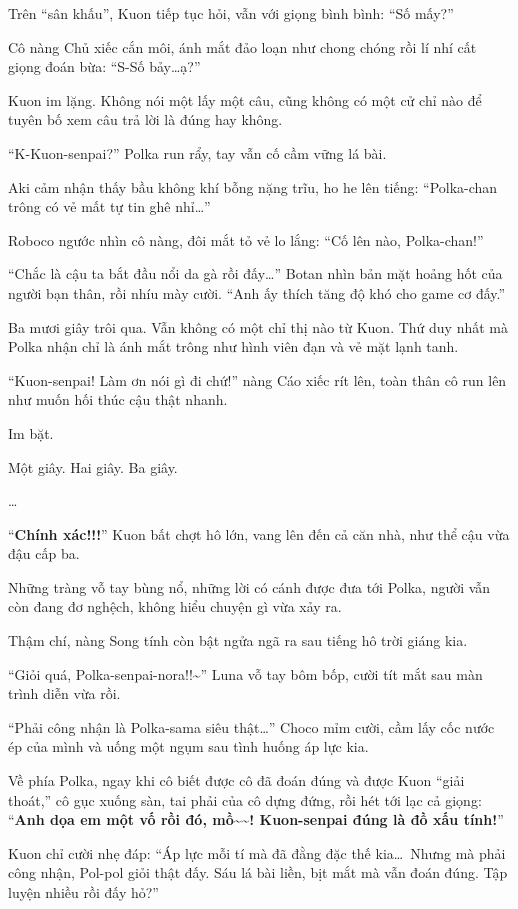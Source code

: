 \documentclass[../main.tex]{subfiles}
\begin{document}
Trên ``sân khấu'', Kuon tiếp tục hỏi, vẫn với giọng bình bình: ``Số mấy?''

Cô nàng Chủ xiếc cắn môi, ánh mắt đảo loạn như chong chóng rồi lí nhí cất giọng đoán bừa: ``S-Số bảy\dots ạ?''

Kuon im lặng. Không nói một lấy một câu, cũng không có một cử chỉ nào để tuyên bố xem câu trả lời là đúng hay không.

``K-Kuon-senpai?'' Polka run rẩy, tay vẫn cố cầm vững lá bài.

Aki cảm nhận thấy bầu không khí bỗng nặng trĩu, ho he lên tiếng: ``Polka-chan trông có vẻ mất tự tin ghê nhỉ\dots''

Roboco ngước nhìn cô nàng, đôi mắt tỏ vẻ lo lắng: ``Cố lên nào, Polka-chan!''

``Chắc là cậu ta bắt đầu nổi da gà rồi đấy\dots'' Botan nhìn bản mặt hoảng hốt của người bạn thân, rồi nhíu mày cười. ``Anh ấy thích tăng độ khó cho game cơ đấy.''

Ba mươi giây trôi qua. Vẫn không có một chỉ thị nào từ Kuon. Thứ duy nhất mà Polka nhận chỉ là ánh mắt trông như hình viên đạn và vẻ mặt lạnh tanh.

``Kuon-senpai! Làm ơn nói gì đi chứ!'' nàng Cáo xiếc rít lên, toàn thân cô run lên như muốn hối thúc cậu thật nhanh.

Im bặt.

Một giây. Hai giây. Ba giây.

\dots

``\textbf{Chính xác!!!}'' Kuon bất chợt hô lớn, vang lên đến cả căn nhà, như thể cậu vừa đậu cấp ba.

Những tràng vỗ tay bùng nổ, những lời có cánh được đưa tới Polka, người vẫn còn đang đơ nghệch, không hiểu chuyện gì vừa xảy ra.

Thậm chí, nàng Song tính còn bật ngửa ngã ra sau tiếng hô trời giáng kia.

``Giỏi quá, Polka-senpai-nora!!\~{}'' Luna vỗ tay bôm bốp, cười tít mắt sau màn trình diễn vừa rồi.

``Phải công nhận là Polka-sama siêu thật\dots'' Choco mỉm cười, cầm lấy cốc nước ép của mình và uống một ngụm sau tình huống áp lực kia.

Về phía Polka, ngay khi cô biết được cô đã đoán đúng và được Kuon ``giải thoát,'' cô gục xuống sàn, tai phải của cô dựng đứng, rồi hét tới lạc cả giọng: ``\textbf{Anh dọa em một vố rồi đó, mồ\~{}\~{}! Kuon-senpai đúng là đồ xấu tính!}''

Kuon chỉ cười nhẹ đáp: ``Áp lực mỗi tí mà đã đằng đặc thế kia\dots\ Nhưng mà phải công nhận, Pol-pol giỏi thật đấy. Sáu lá bài liền, bịt mắt mà vẫn đoán đúng. Tập luyện nhiều rồi đấy hỏ?''
\end{document}
